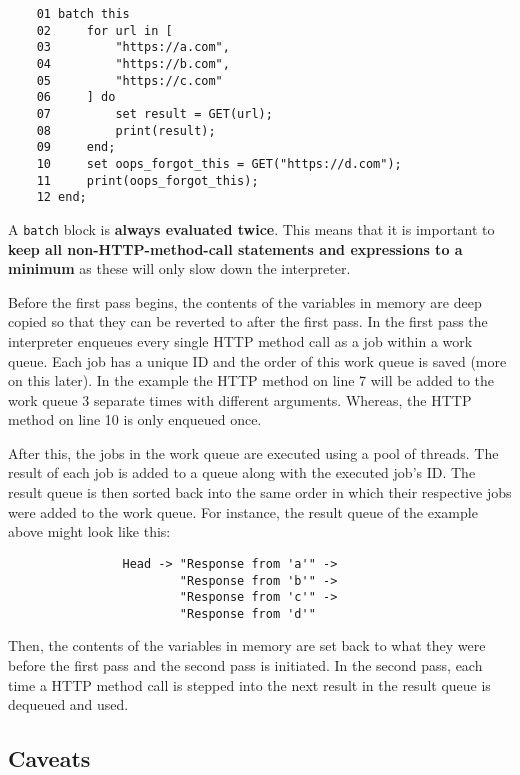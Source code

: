 \documentclass[12pt, letterpaper]{article}
\begin{document}
\begin{center}
    \begin{verbatim}
    01 batch this
    02     for url in [
    03         "https://a.com",
    04         "https://b.com",
    05         "https://c.com"
    06     ] do
    07         set result = GET(url);
    08         print(result);
    09     end;
    10     set oops_forgot_this = GET("https://d.com");
    11     print(oops_forgot_this);
    12 end;
    \end{verbatim}
\end{center}

A \verb|batch| block is \textbf{always evaluated twice}. This means that it is important to \textbf{keep all non-HTTP-method-call statements and expressions to a minimum} as these will only slow down the interpreter.

Before the first pass begins, the contents of the variables in memory are deep copied so that they can be reverted to after the first pass. In the first pass the interpreter enqueues every single HTTP method call as a job within a work queue. Each job has a unique ID and the order of this work queue is saved (more on this later). In the example the HTTP method on line 7 will be added to the work queue 3 separate times with different arguments. Whereas, the HTTP method on line 10 is only enqueued once.

After this, the jobs in the work queue are executed using a pool of threads. The result of each job is added to a queue along with the executed job's ID. The result queue is then sorted back into the same order in which their respective jobs were added to the work queue. For instance, the result queue of the example above might look like this:

\begin{center}
    \begin{verbatim}
                Head -> "Response from 'a'" ->
                        "Response from 'b'" ->
                        "Response from 'c'" ->
                        "Response from 'd'"
    \end{verbatim}
\end{center}

Then, the contents of the variables in memory are set back to what they were before the first pass and the second pass is initiated. In the second pass, each time a HTTP method call is stepped into the next result in the result queue is dequeued and used.

\subsection{Caveats}
\end{document}
